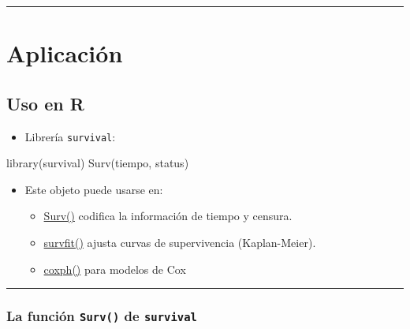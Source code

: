 \documentclass[
]{article}
\newenvironment{Shaded}{\begin{snugshade}}{\end{snugshade}}
\newcommand{\FunctionTok}[1]{\textcolor[rgb]{0.28,0.35,0.67}{#1}}
\newcommand{\NormalTok}[1]{\textcolor[rgb]{0.00,0.23,0.31}{#1}}
\providecommand{\tightlist}{%
  \setlength{\itemsep}{0pt}\setlength{\parskip}{0pt}}
\begin{document}
\begin{center}\rule{0.5\linewidth}{0.5pt}\end{center}

\section{Aplicación}\label{aplicaciuxf3n}

\subsection{Uso en R}\label{uso-en-r}

\begin{itemize}
\tightlist
\item
  Librería \texttt{survival}:
\end{itemize}

\begin{Shaded}
\begin{Highlighting}[]
\FunctionTok{library}\NormalTok{(survival)}
\FunctionTok{Surv}\NormalTok{(tiempo, status)}
\end{Highlighting}
\end{Shaded}

\begin{itemize}
\tightlist
\item
  Este objeto puede usarse en:

  \begin{itemize}
  \tightlist
  \item
    \href{https://www.rdocumentation.org/packages/survival/versions/3.5-7/topics/Surv}{Surv()}
    codifica la información de tiempo y censura.
  \item
    \href{https://www.rdocumentation.org/packages/survival/versions/3.8-3/topics/survfit.formula}{survfit()}
    ajusta curvas de supervivencia (Kaplan-Meier).
  \item
    \href{https://www.rdocumentation.org/packages/survival/versions/3.5-7/topics/coxph}{coxph()}
    para modelos de Cox
  \end{itemize}
\end{itemize}

\begin{center}\rule{0.5\linewidth}{0.5pt}\end{center}

\subsubsection{\texorpdfstring{La función \texttt{Surv()} de
\texttt{survival}}{La función Surv() de survival}}\label{la-funciuxf3n-surv-de-survival}
\end{document}
